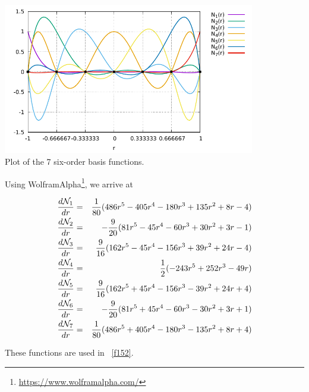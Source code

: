 \begin{center}
\includegraphics[width=11cm]{images/basis1D/Q6.pdf}\\
{\captionfont Plot of the 7 six-order basis functions.}
\end{center}

Using WolframAlpha\footnote{\url{https://www.wolframalpha.com/}}, we arrive at 

\begin{eqnarray}
\frac{d {\mathcal{N}}_1}{dr} &=& \frac{1}{80} (486r^5 - 405r^4 - 180r^3 + 135 r^2 +8r-4) \nonumber\\
\frac{d {\mathcal{N}}_2}{dr} &=& -\frac{9}{20} (81r^5 - 45r^4 -60r^3 + 30r^2 +3r -1) \nonumber\\ 
\frac{d {\mathcal{N}}_3}{dr} &=& \frac{9}{16} (162r^5-45r^4 -156r^3 +39r^2 +24r -4) \nonumber\\ 
\frac{d {\mathcal{N}}_4}{dr} &=& \frac{1}{2} (-243r^5+252r^3-49r) \nonumber\\
\frac{d {\mathcal{N}}_5}{dr} &=& \frac{9}{16} (162r^5 +45r^4 -156r^3 -39r^2 +24r +4) \nonumber\\ 
\frac{d {\mathcal{N}}_6}{dr} &=& -\frac{9}{20} (81r^5 +45r^4 -60r^3 - 30r^2 +3r +1) \nonumber\\ 
\frac{d {\mathcal{N}}_7}{dr} &=& \frac{1}{80} (486r^5 + 405r^4 - 180r^3 -135r^2 +8r+4) 
\end{eqnarray}

These functions are used in \stone~\ref{f152}.







